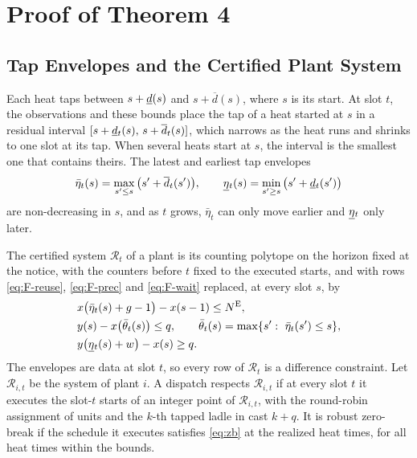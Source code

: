 \documentclass[11pt]{article}
\newcommand{\NE}{N^{\mathrm{E}}}
\newcommand{\calR}{\mathcal{R}}
\newcommand{\dmin}{\vphantom{\underline{d}}\smash[b]{\underline{d}}}
\newcommand{\dmax}{\overline{d}}
\newcommand{\etamin}{\vphantom{\underline{\eta}}\smash[b]{\underline{\eta}}}
\begin{document}
\section{Proof of Theorem 4}\label{sec:thm4}

\subsection{Tap Envelopes and the Certified Plant System}

Each heat taps between $s+\dmin(s)$ and $s+\dmax(s)$, where $s$ is its start. At slot $t$, the observations and these
bounds place the tap of a heat started at $s$ in a residual interval $[s+\dmin_t(s),\,s+\dmax_t(s)]$, which narrows as
the heat runs and shrinks to one slot at its tap. When several heats start at $s$, the interval is the smallest one
that contains theirs. The latest and earliest tap envelopes
\begin{equation}\label{eq:env}
\bar\eta_t(s)=\max_{s'\le s}\big(s'+\dmax_t(s')\big),\qquad \etamin_t(s)=\min_{s'\ge s}\big(s'+\dmin_t(s')\big)
\end{equation}
are non-decreasing in $s$, and as $t$ grows, $\bar\eta_t$ can only move earlier and $\etamin_t$ only later.

The certified system $\calR_t$ of a plant is its counting polytope on the horizon fixed at the notice, with the
counters before $t$ fixed to the executed starts, and with rows \eqref{eq:F-reuse}, \eqref{eq:F-prec} and
\eqref{eq:F-wait} replaced, at every slot $s$, by
\begin{subequations}\label{eq:R}
\begin{align}
& x\big(\bar\eta_t(s)+g-1\big)-x(s-1)\le\NE, \label{eq:R-reuse}\\
& y(s)-x\big(\bar\theta_t(s)\big)\le q,\qquad \bar\theta_t(s)=\max\{s':\ \bar\eta_t(s')\le s\}, \label{eq:R-prec}\\
& y\big(\etamin_t(s)+w\big)-x(s)\ge q. \label{eq:R-wait}
\end{align}
\end{subequations}
The envelopes are data at slot $t$, so every row of $\calR_t$ is a difference constraint. Let $\calR_{i,t}$ be the
system of plant $i$. A dispatch respects $\calR_{i,t}$ if at every slot $t$ it executes the slot-$t$ starts of an
integer point of $\calR_{i,t}$, with the round-robin assignment of units and the $k$-th tapped ladle in cast $k+q$. It
is robust zero-break if the schedule it executes satisfies \eqref{eq:zb} at the realized heat times, for all heat times
within the bounds.
\end{document}
